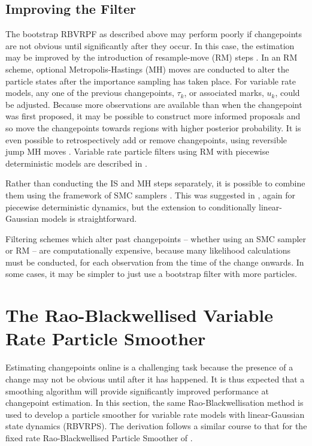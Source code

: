 \documentclass[journal]{IEEEtran}
\begin{document}
\subsection{Improving the Filter}

The bootstrap RBVRPF as described above may perform poorly if changepoints are not obvious until significantly after they occur. In this case, the estimation may be improved by the introduction of resample-move (RM) steps \cite{Gilks2001}. In an RM scheme, optional Metropolis-Hastings (MH) moves are conducted to alter the particle states after the importance sampling has taken place. For variable rate models, any one of the previous changepoints, $\tau_k$, or associated marks, $u_k$, could be adjusted. Because more observations are available than when the changepoint was first proposed, it may be possible to construct more informed proposals and so move the changepoints towards regions with higher posterior probability. It is even possible to retrospectively add or remove changepoints, using reversible jump MH moves \cite{Green1995}. Variable rate particle filters using RM with piecewise deterministic models are described in \cite{Whiteley2011,Gilholm2008}.

Rather than conducting the IS and MH steps separately, it is possible to combine them using the framework of SMC samplers \cite{DelMoral2006}. This was suggested in \cite{Whiteley2011}, again for piecewise deterministic dynamics, but the extension to conditionally linear-Gaussian models is straightforward.

Filtering schemes which alter past changepoints -- whether using an SMC sampler or RM -- are computationally expensive, because many likelihood calculations must be conducted, for each observation from the time of the change onwards. In some cases, it may be simpler to just use a bootstrap filter with more particles.



\section{The Rao-Blackwellised Variable Rate Particle Smoother} \label{sec:rbvrps}

Estimating changepoints online is a challenging task because the presence of a change may not be obvious until after it has happened. It is thus expected that a smoothing algorithm will provide significantly improved performance at changepoint estimation. In this section, the same Rao-Blackwellisation method is used to develop a particle smoother for variable rate models with linear-Gaussian state dynamics (RBVRPS). The derivation follows a similar course to that for the fixed rate Rao-Blackwellised Particle Smoother of \cite{Sarkka2012}.
\end{document}
